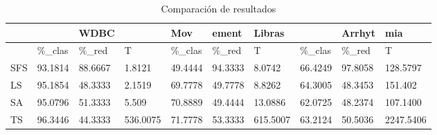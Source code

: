 \begin{table}[H]
	\centering
	\begin{tabular}{l|lll|lll|lll}
			& 			& WDBC 		&			&	  Mov	& ement 	& Libras	&			& Arrhyt	& mia		\\ \hline
			& \%\_clas	& \%\_red	& T			& \%\_clas	& \%\_red	& T			& \%\_clas	& \%\_red	& T			\\ \hline
		SFS	& 93.1814	& 88.6667 	& 1.8121	& 49.4444	& 94.3333	& 8.0742	& 66.4249	& 97.8058	& 128.5797 	\\ \hline
		LS	& 95.1854	& 48.3333	& 2.1519	& 69.7778	& 49.7778	& 8.8262	& 64.3005	& 48.3453	& 151.402  	\\ \hline
		SA	& 95.0796	& 51.3333	& 5.509		& 70.8889	& 49.4444	& 13.0886	& 62.0725	& 48.2374	& 107.1400	\\ \hline
		TS	& 96.3446	& 44.3333	& 536.0075	& 71.7778	& 53.3333	& 615.5007	& 63.2124	& 50.5036	& 2247.5406
		
	\end{tabular}
	\caption{Comparación de resultados}
	\label{Compare}
\end{table}